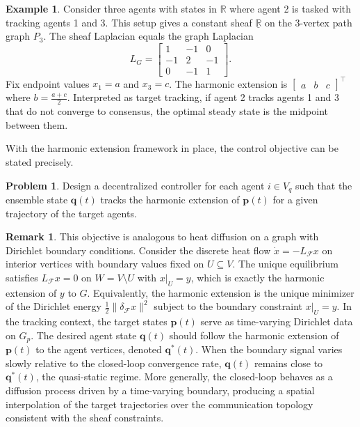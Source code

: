 \documentclass[letterpaper, 10 pt, conference]{ieeeconf}
\newcommand{\R}{\mathbb{R}}
\newcommand{\FF}{\mathcal{F}}
\theoremstyle{definition}
\newtheorem{example}{Example}
\newtheorem{remark}{Remark}
\newtheorem{problem}{Problem}
\begin{document}
\begin{example}
    Consider three agents with states in $\R$ where agent 2 is tasked with tracking agents 1 and 3. This setup gives a constant sheaf $\underline{\R}$ on the 3-vertex path graph $P_3$. The sheaf Laplacian equals the graph Laplacian
    \[
    L_G = \begin{bmatrix}
        1 & -1 & 0\\
        -1 & 2 & -1 \\
        0 & -1 & 1
    \end{bmatrix}.
    \]
    Fix endpoint values $x_1 = a$ and $x_3 = c$. The harmonic extension is $\begin{bmatrix}
        a & b & c
    \end{bmatrix}^\top$
    where $b = \frac{a+c}{2}$. Interpreted as target tracking, if agent 2 tracks agents 1 and 3 that do not converge to consensus, the optimal steady state is the midpoint between them.
\end{example}

With the harmonic extension framework in place, the control objective can be stated precisely.

\begin{problem}\label{prob:1}
    Design a decentralized controller for each agent $i\in V_q$ such that the ensemble state $\mathbf{q}(t)$ tracks the harmonic extension of $\mathbf{p}(t)$ for a given trajectory of the target agents.
\end{problem}

\begin{remark}
    This objective is analogous to heat diffusion on a graph with Dirichlet boundary conditions. Consider the discrete heat flow $\dot{x}=-L_\FF x$ on interior vertices with boundary values fixed on $U\subseteq V$. The unique equilibrium satisfies $L_\FF x=0$ on $W=V\setminus U$ with $x|_U=y$, which is exactly the harmonic extension of $y$ to $G$. Equivalently, the harmonic extension is the unique minimizer of the Dirichlet energy $\frac{1}{2} \|\delta_\FF x\|^2$ subject to the boundary constraint $x|_U=y$.
    In the tracking context, the target states $\mathbf{p}(t)$ serve as time-varying Dirichlet data on $G_p$. The desired agent state $\mathbf{q}(t)$ should follow the harmonic extension of $\mathbf{p}(t)$ to the agent vertices, denoted $\mathbf{q}^*(t)$. When the boundary signal varies slowly relative to the closed-loop convergence rate, $\mathbf{q}(t)$ remains close to $\mathbf{q}^\ast(t)$, the quasi-static regime. More generally, the closed-loop behaves as a diffusion process driven by a time-varying boundary, producing a spatial interpolation of the target trajectories over the communication topology consistent with the sheaf constraints. %
\end{remark}
\end{document}
